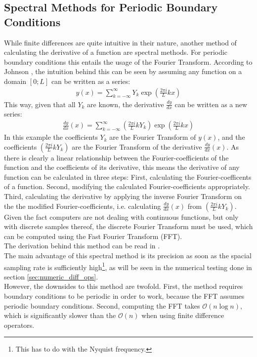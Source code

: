 \subsection{Spectral Methods for Periodic Boundary Conditions}
While finite differences are quite intuitive in their nature, another method of calculating the derivative of a function are spectral methods.
For periodic boundary conditions this entails the usage of the Fourier Transform.
According to Johnson \cite{johnson2011notes}, the intuition behind this can be seen by assuming any function on a domain $[0;L]$ can be written as a series:
\begin{align*}
y(x) = \sum_{k=-\infty}^{\infty}Y_k\exp \left(\frac{2\pi i}{L}kx\right)
\end{align*}
This way, given that all $Y_k$ are known, the derivative $\frac{dy}{dx}$ can be written as a new series:
\begin{align*}
\frac{dy}{dx}(x) = \sum_{k=-\infty}^{\infty}\left(\frac{2\pi i}{L}kY_k\right)\exp \left(\frac{2\pi i}{L}kx\right)
\end{align*}
In this example the coefficients $Y_k$ are the Fourier Transform of $y(x)$, and the coefficients $(\frac{2\pi i}{L}kY_k)$ are the Fourier Transform of the derivative $\frac{dy}{dx}(x)$.
As there is clearly a linear relationship between the Fourier-coefficients of the function and the coefficients of its derivative, this means the derivative of any function can be calculated in three steps:
First, calculating the Fourier-coefficents of a function.
Second, modifying the calculated Fourier-coefficients appropriately.
Third, calculating the derivative by applying the inverse Fourier Transform on the the modified Fourier-coefficients, i.e. calculating $\frac{dy}{dx}(x)$ from $(\frac{2\pi i}{L}kY_k)$.\\
Given the fact computers are not dealing with continuous functions, but only with discrete samples thereof, the discrete Fourier Transform must be used, which can be computed using the Fast Fourier Transform (FFT).\\
The derivation behind this method can be read in \cite{johnson2011notes}.\\
The main advantage of this spectral method is its precision as soon as the spacial sampling rate is sufficiently high\footnote{This has to do with the Nyquist frequency.}, as will be seen in the numerical testing done in section \ref{sec:numeric_diff_ops}.\\
However, the downsides to this method are twofold.
First, the method requires boundary conditions to be periodic in order to work, because the FFT assumes periodic boundary conditions.
Second, computing the FFT takes $\mathcal{O}(n\log n)$, which is significantly slower than the $\mathcal{O}(n)$ when using finite difference operators.

